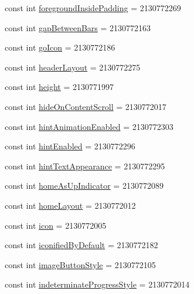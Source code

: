 \begin{CompactItemize}
\item 
const int \hyperlink{class__2doo_1_1_droid_1_1_resource_1_1_attribute_e20a01e3e20652aaa355fd15caaf2aa3}{foregroundInsidePadding} = 2130772269
\item 
const int \hyperlink{class__2doo_1_1_droid_1_1_resource_1_1_attribute_dbe03b0875439b691e423f430f5a4ed6}{gapBetweenBars} = 2130772163
\item 
const int \hyperlink{class__2doo_1_1_droid_1_1_resource_1_1_attribute_bcaa1a3da0b4109e45787efc3d4af0cf}{goIcon} = 2130772186
\item 
const int \hyperlink{class__2doo_1_1_droid_1_1_resource_1_1_attribute_fe67b47cd7e00177f42f1932a7190c18}{headerLayout} = 2130772275
\item 
const int \hyperlink{class__2doo_1_1_droid_1_1_resource_1_1_attribute_cd2b3868fb3ce3baad65f1752529b265}{height} = 2130771997
\item 
const int \hyperlink{class__2doo_1_1_droid_1_1_resource_1_1_attribute_a030e4441db2b57773456f80877fe0a8}{hideOnContentScroll} = 2130772017
\item 
const int \hyperlink{class__2doo_1_1_droid_1_1_resource_1_1_attribute_35725d8243f3ddfcec92e6f73c178949}{hintAnimationEnabled} = 2130772303
\item 
const int \hyperlink{class__2doo_1_1_droid_1_1_resource_1_1_attribute_47f2aed3d3d35bdd330d91f01d5d84a4}{hintEnabled} = 2130772296
\item 
const int \hyperlink{class__2doo_1_1_droid_1_1_resource_1_1_attribute_8d87982913d9b1e8e599759756f1bcf2}{hintTextAppearance} = 2130772295
\item 
const int \hyperlink{class__2doo_1_1_droid_1_1_resource_1_1_attribute_f463194fd8f084bafe68fb5c23827869}{homeAsUpIndicator} = 2130772089
\item 
const int \hyperlink{class__2doo_1_1_droid_1_1_resource_1_1_attribute_73a028a6c5810aff3d11dbb3e618f8bf}{homeLayout} = 2130772012
\item 
const int \hyperlink{class__2doo_1_1_droid_1_1_resource_1_1_attribute_01a2d291eb7c9b3b0ed3143f37b647f2}{icon} = 2130772005
\item 
const int \hyperlink{class__2doo_1_1_droid_1_1_resource_1_1_attribute_605ed063fa2660eb05370958d4501440}{iconifiedByDefault} = 2130772182
\item 
const int \hyperlink{class__2doo_1_1_droid_1_1_resource_1_1_attribute_e0ae4cc77ff873a830c17bdd0da4134b}{imageButtonStyle} = 2130772105
\item 
const int \hyperlink{class__2doo_1_1_droid_1_1_resource_1_1_attribute_d278711c3ea0eaf69970af6e45b9f5b2}{indeterminateProgressStyle} = 2130772014

\end{CompactItemize}

